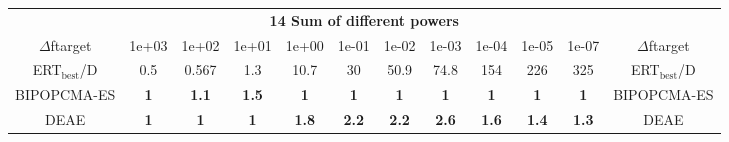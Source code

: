 \begin{tabular}{cccccccccccc}
 & \multicolumn{10}{c}{{\normalsize \textbf{14 Sum of different powers}}}\\
$\Delta$ftarget& 1e+03& 1e+02& 1e+01& 1e+00& 1e-01& 1e-02& 1e-03& 1e-04& 1e-05& 1e-07 & $\Delta$ftarget \\
ERT$_{\textrm{best}}$/D& 0.5& 0.567& 1.3& 10.7& 30& 50.9& 74.8& 154& 226& 325 & ERT$_{\textrm{best}}$/D \\
\hline
BIPOPCMA-ES & \textbf{1} & \textbf{1.1} & \textbf{1.5} & \textbf{1} & \textbf{1} & \textbf{1} & \textbf{1} & \textbf{1} & \textbf{1} & \textbf{1} & BIPOPCMA-ES \cite{add_an_entry_for_BIPOPCMA-ES_in_bbob.bib}\\
DEAE & \textbf{1} & \textbf{1} & \textbf{1} & \textbf{1.8} & \textbf{2.2} & \textbf{2.2} & \textbf{2.6} & \textbf{1.6} & \textbf{1.4} & \textbf{1.3} & DEAE \cite{add_an_entry_for_DEAE_in_bbob.bib}
\end{tabular}
